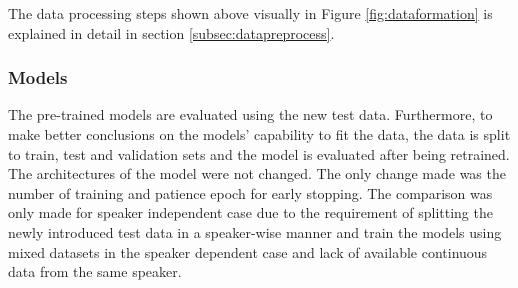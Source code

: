 \documentclass[a4paper,11pt]{article}
\begin{document}
The data processing steps shown above visually in Figure \ref{fig:dataformation} is explained in detail in section \ref{subsec:datapreprocess}.

\pagebreak

\subsubsection{Models}

The pre-trained models are evaluated using the new test data. Furthermore, to make better conclusions on the models' capability to fit the data, the data is split to train, test and validation sets and the model is evaluated after being retrained. The architectures of the model were not changed. The only change made was the number of training and patience epoch for early stopping. The comparison was only made for speaker independent case due to the requirement of splitting the newly introduced test data in a speaker-wise manner and train the models using mixed datasets in the speaker dependent case and lack of available continuous data from the same speaker.
\end{document}

